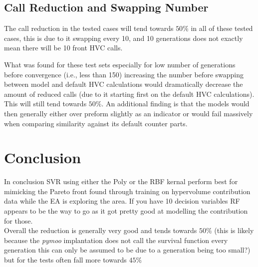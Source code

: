 \documentclass[sigconf,review,nonacm]{acmart}
\begin{document}
\subsection{Call Reduction and Swapping Number}

The call reduction in the tested cases will tend towards $50\%$ in all of these tested cases, this is due to it swapping every 10, and 10 generations does not exactly mean there will be 10 front HVC calls.

What was found for these test sets especially for low number of generations before convergence (i.e., less than 150) increasing the number before swapping between model and default HVC calculations would dramatically decrease the amount of reduced calls (due to it starting first on the default HVC calculations). This will still tend towards $50\%$. An additional finding is that the models would then generally either over preform slightly as an indicator or would fail massively when comparing similarity against its default counter parts. 

\section{Conclusion}

In conclusion SVR using either the Poly or the RBF kernal perform best for mimicking the Pareto front found through training on hypervolume contribution data while the EA is exploring the area. If you have 10 decision variables RF appears to be the way to go as it got pretty good at modelling the contribution for those. \\

\noindent Overall the reduction is generally very good and tends towards $50\%$ (this is likely because the \textit{pymoo} implantation does not call the survival function every generation this can only be assumed to be due to a generation being too small?) but for the tests often fall more towards $45\%$

\centering
\end{document}
